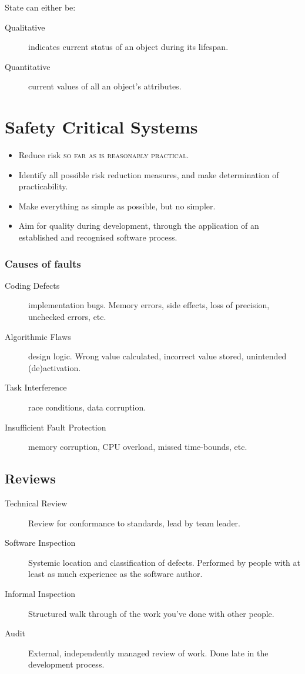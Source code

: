 \documentclass[landscape]{cheat}
\begin{document}
\begin{multicols}{3}
State can either be:
\begin{description}
    \item[Qualitative] indicates current status of an object during its lifespan.
    \item[Quantitative] current values of all an object's attributes.
\end{description}

\section{Safety Critical Systems}
\begin{itemize}
    \item Reduce risk \textsc{so far as is reasonably practical}.
    \item Identify all possible risk reduction measures, and make determination of practicability.
    \item Make everything as simple as possible, but no simpler.
    \item Aim for quality during development, through the application of an established and recognised software process.
\end{itemize}

\subsubsection{Causes of faults}
\begin{description}
    \item[Coding Defects] implementation bugs. Memory errors, side effects, loss of precision, unchecked errors, etc.
    \item[Algorithmic Flaws] design logic. Wrong value calculated, incorrect value stored, unintended (de)activation.
    \item[Task Interference] race conditions, data corruption.
    \item[Insufficient Fault Protection] memory corruption, CPU overload, missed time-bounds, etc.
\end{description}

\subsection{Reviews}
\begin{description}
    \item[Technical Review] Review for conformance to standards, lead by team leader.
    \item[Software Inspection] Systemic location and classification of defects. Performed by people with at least as much experience as the software author.
    \item[Informal Inspection] Structured walk through of the work you've done with other people.
    \item[Audit] External, independently managed review of work. Done late in the development process.
\end{description}

\end{multicols}
\end{document}
